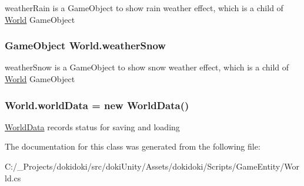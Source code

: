weather\+Rain is a Game\+Object to show rain weather effect, which is a child of \hyperlink{class_world}{World} Game\+Object 

\subsubsection[{\texorpdfstring{weather\+Snow}{weatherSnow}}]{\setlength{\rightskip}{0pt plus 5cm}Game\+Object World.\+weather\+Snow}\hypertarget{class_world_a1cc76aaa480d30c16705ffc0516ff388}{}\label{class_world_a1cc76aaa480d30c16705ffc0516ff388}


weather\+Snow is a Game\+Object to show snow weather effect, which is a child of \hyperlink{class_world}{World} Game\+Object 

\subsubsection[{\texorpdfstring{world\+Data}{worldData}}]{ World.\+world\+Data = new {\bf World\+Data}()}\hypertarget{class_world_a1fbe122911090d8260c2adb3154948e9}{}\label{class_world_a1fbe122911090d8260c2adb3154948e9}


\hyperlink{class_world_data}{World\+Data} records status for saving and loading 



The documentation for this class was generated from the following file\+:\begin{DoxyCompactItemize}
\item 
C\+:/\+\_\+\+Projects/dokidoki/src/doki\+Unity/\+Assets/dokidoki/\+Scripts/\+Game\+Entity/World.\+cs\end{DoxyCompactItemize}
